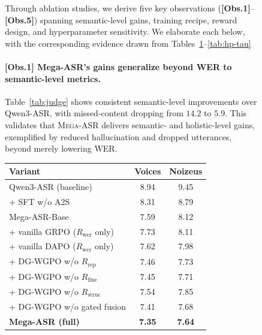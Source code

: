 \documentclass{llmxive}
\begin{document}
\begin{figure}[!h]
\begin{minipage}[c]{0.46\textwidth}
Through ablation studies, we derive five key observations (\textbf{[Obs.1]}--\textbf{[Obs.5]}) spanning semantic-level gains, training recipe, reward design, and hyperparameter sensitivity. We elaborate each below, with the corresponding evidence drawn from Tables~\ref{tab:ablation}--\ref{tab:hp-tau} \paragraph{\textbf{[Obs.1] Mega-ASR's gains generalize beyond WER to semantic-level metrics.}}
Table~\ref{tab:judge} shows consistent semantic-level improvements over Qwen3-ASR, with missed-content dropping from $14.2$ to $5.9$. This validates that \textsc{Mega-ASR} delivers semantic- and holistic-level gains, exemplified by reduced hallucination and dropped utterances, beyond merely lowering WER.
\end{minipage}%
\hfill
\begin{minipage}[c]{0.52\textwidth}
\centering
{}
\label{tab:ablation}
\small
\begin{tabular}{lcc}
\toprule
\textbf{Variant} & \textbf{Voices} & \textbf{Noizeus} \\
\midrule
Qwen3-ASR (baseline)            & 8.94 & 9.45 \\
\midrule
+ SFT w/o A2S     & 8.31 & 8.79 \\
Mega-ASR-Base    &  7.59 & 8.12 \\
\midrule
+ vanilla GRPO ($R_\text{wer}$ only) & 7.73 & 8.11 \\
+ vanilla DAPO ($R_\text{wer}$ only) & 7.62 & 7.98 \\
+ DG-WGPO w/o $R_\text{rep}$    & 7.46 & 7.73 \\
+ DG-WGPO w/o $R_\text{fine}$   & 7.45 & 7.71 \\
+ DG-WGPO w/o $R_\text{struc}$  & 7.54 & 7.85 \\
+ DG-WGPO w/o gated fusion      & 7.41 & 7.68 \\
\midrule
\textbf{Mega-ASR (full)}        & \textbf{7.35} & \textbf{7.64} \\
\bottomrule
\end{tabular}
\end{minipage}
\end{figure}
\end{document}
